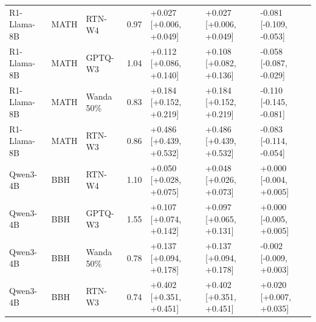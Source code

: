 \begin{tabular}{lllrlll}
R1-Llama-8B & MATH & RTN-W4 & 0.97 & +0.027 [+0.006, +0.049] & +0.027 [+0.006, +0.049] & -0.081 [-0.109, -0.053] \\
R1-Llama-8B & MATH & GPTQ-W3 & 1.04 & +0.112 [+0.086, +0.140] & +0.108 [+0.082, +0.136] & -0.058 [-0.087, -0.029] \\
R1-Llama-8B & MATH & Wanda 50\% & 0.83 & +0.184 [+0.152, +0.219] & +0.184 [+0.152, +0.219] & -0.110 [-0.145, -0.081] \\
R1-Llama-8B & MATH & RTN-W3 & 0.86 & +0.486 [+0.439, +0.532] & +0.486 [+0.439, +0.532] & -0.083 [-0.114, -0.054] \\
Qwen3-4B & BBH & RTN-W4 & 1.10 & +0.050 [+0.028, +0.075] & +0.048 [+0.026, +0.073] & +0.000 [-0.004, +0.005] \\
Qwen3-4B & BBH & GPTQ-W3 & 1.55 & +0.107 [+0.074, +0.142] & +0.097 [+0.065, +0.131] & +0.000 [-0.005, +0.005] \\
Qwen3-4B & BBH & Wanda 50\% & 0.78 & +0.137 [+0.094, +0.178] & +0.137 [+0.094, +0.178] & -0.002 [-0.009, +0.003] \\
Qwen3-4B & BBH & RTN-W3 & 0.74 & +0.402 [+0.351, +0.451] & +0.402 [+0.351, +0.451] & +0.020 [+0.007, +0.035] \\
\bottomrule
\end{tabular}
